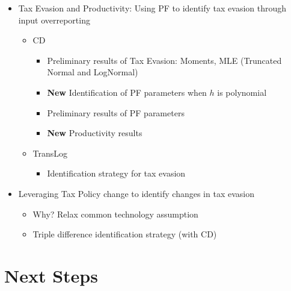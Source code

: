 \documentclass[
  12pt]{article}
\providecommand{\tightlist}{%
  \setlength{\itemsep}{0pt}\setlength{\parskip}{0pt}}\usepackage{longtable,booktabs,array}
\theoremstyle{definition}
\theoremstyle{remark}
\begin{document}
\begin{itemize}
\tightlist
\item
  Tax Evasion and Productivity: Using PF to identify tax evasion through
  input overreporting

  \begin{itemize}
  \tightlist
  \item
    CD

    \begin{itemize}
    \tightlist
    \item
      Preliminary results of Tax Evasion: Moments, MLE (Truncated Normal
      and LogNormal)
    \item
      \textbf{New} Identification of PF parameters when \(h\) is
      polynomial
    \item
      Preliminary results of PF parameters
    \item
      \textbf{New} Productivity results
    \end{itemize}
  \item
    TransLog

    \begin{itemize}
    \tightlist
    \item
      Identification strategy for tax evasion
    \end{itemize}
  \end{itemize}
\item
  Leveraging Tax Policy change to identify changes in tax evasion

  \begin{itemize}
  \tightlist
  \item
    Why? Relax common technology assumption
  \item
    Triple difference identification strategy (with CD)
  \end{itemize}
\end{itemize}

\section*{Next Steps}\label{next-steps}
\end{document}
